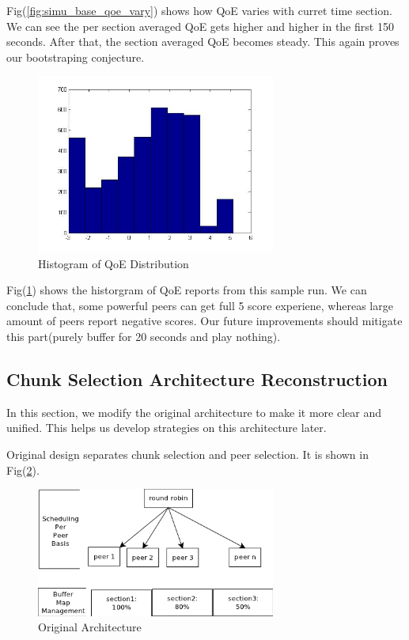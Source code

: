 \documentclass[11pt,a4paper]{article}
\begin{document}
Fig(\ref{fig:simu_base_qoe_vary}) shows how QoE varies with curret time section. 
We can see the per section averaged QoE gets higher and higher in 
the first 150 seconds. After that, the section averaged QoE becomes steady. 
This again proves our bootstraping conjecture. 


\begin{figure}[htb]
\centering
	\includegraphics[width=0.7\textwidth]{../fig/qoe_hist.jpg}
	\caption{Histogram of QoE Distribution}
	\label{fig:simu_base_qoe_distri}
\end{figure}

Fig(\ref{fig:simu_base_qoe_distri}) shows the historgram of QoE reports
from this sample run. We can conclude that, some powerful peers can get 
full 5 score experiene, whereas large amount of peers report negative scores.
Our future improvements should mitigate this part(purely buffer for 
20 seconds and play nothing). 

\subsection{Chunk Selection Architecture Reconstruction}
\label{sec:arch}

In this section, we modify the original architecture to make
it more clear and unified. This helps us develop strategies 
on this architecture later. 

Original design separates chunk selection and peer selection. 
It is shown in Fig(\ref{fig:simu_arch_orig}). 

\begin{figure}[htb]
\centering
	\includegraphics[width=0.7\textwidth]{../fig/arch_orig.png}
	\caption{Original Architecture}
	\label{fig:simu_arch_orig}
\end{figure}
\end{document}
